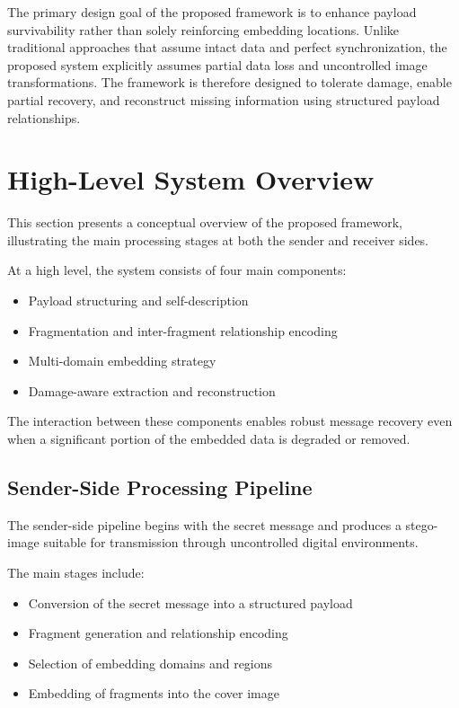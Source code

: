 \documentclass[12pt,a4paper,oneside]{report}
\begin{document}
	The primary design goal of the proposed framework is to enhance payload survivability rather than solely reinforcing embedding locations. Unlike traditional approaches that assume intact data and perfect synchronization, the proposed system explicitly assumes partial data loss and uncontrolled image transformations. The framework is therefore designed to tolerate damage, enable partial recovery, and reconstruct missing information using structured payload relationships.
	
	\section{High-Level System Overview}
	This section presents a conceptual overview of the proposed framework, illustrating the main processing stages at both the sender and receiver sides.
	
	At a high level, the system consists of four main components:
	\begin{itemize}
		\item Payload structuring and self-description
		\item Fragmentation and inter-fragment relationship encoding
		\item Multi-domain embedding strategy
		\item Damage-aware extraction and reconstruction
	\end{itemize}
	
	The interaction between these components enables robust message recovery even when a significant portion of the embedded data is degraded or removed.
	
	\subsection{Sender-Side Processing Pipeline}
	The sender-side pipeline begins with the secret message and produces a stego-image suitable for transmission through uncontrolled digital environments.
	
	The main stages include:
	\begin{itemize}
		\item Conversion of the secret message into a structured payload
		\item Fragment generation and relationship encoding
		\item Selection of embedding domains and regions
		\item Embedding of fragments into the cover image
	\end{itemize}
	
\end{document}
